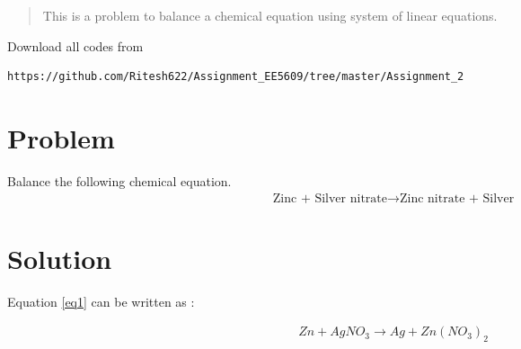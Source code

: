 \documentclass[journal,12pt,twocolumn]{IEEEtran}
\begin{document}
\maketitle
\newpage
\bigskip
\renewcommand{\thefigure}{\theenumi}
\renewcommand{\thetable}{\theenumi}
\begin{abstract}
This is a problem to balance a chemical equation using system of linear equations.
\end{abstract}
Download all  codes from 
\begin{lstlisting}
https://github.com/Ritesh622/Assignment_EE5609/tree/master/Assignment_2
\end{lstlisting}
%

\section{Problem}
    Balance the following chemical equation.
    \begin{align}
        \label{eq1} \text{Zinc + Silver nitrate} \to \text{Zinc nitrate + Silver}
    \end{align}
    
\section{Solution}

Equation \ref{eq1}  can be written as :

\begin{align}
\label{eq2} Zn+ AgNO_{3} \to Ag + Zn(NO_{3})_{2}
\end{align}
\end{document}
